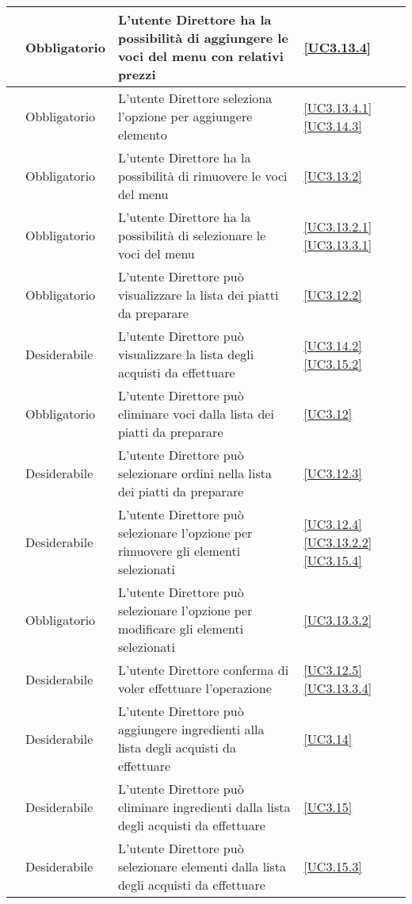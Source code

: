 \begin{longtable}{|P{1.5cm}|P{2.5cm}|P{6.5cm}|P{2.5cm}|}
	\hline \RequisitoObF\label{L79} & Obbligatorio & L'utente Direttore ha la possibilità di aggiungere le voci del menu con relativi prezzi & \ref{UC3.13.4} \\
	\hline \RequisitoObF\label{L108} & Obbligatorio & L'utente Direttore seleziona l'opzione per aggiungere elemento & \ref{UC3.13.4.1} \ref{UC3.14.3}\\
	\hline \RequisitoObF\label{L80} & Obbligatorio & L'utente Direttore ha la possibilità di rimuovere le voci del menu & \ref{UC3.13.2} \\
	\hline \RequisitoObF\label{L106} & Obbligatorio & L'utente Direttore ha la possibilità di selezionare le voci del menu & \ref{UC3.13.2.1} \ref{UC3.13.3.1} \\
	\hline \RequisitoObF\label{L30} & Obbligatorio & L'utente Direttore può visualizzare la lista dei piatti da preparare & \ref{UC3.12.2} \\
	\hline \RequisitoDF\label{L31} & Desiderabile & L'utente Direttore può visualizzare la lista degli acquisti da effettuare & \ref{UC3.14.2} \ref{UC3.15.2} \\
	\hline \RequisitoObF\label{L32} & Obbligatorio & L'utente Direttore può eliminare voci dalla lista dei piatti da preparare & \ref{UC3.12} \\
	\hline \RequisitoDF\label{L101} & Desiderabile & L'utente Direttore può selezionare ordini nella lista dei piatti da preparare & \ref{UC3.12.3} \\
	\hline \RequisitoDF\label{L102} & Desiderabile & L'utente Direttore può selezionare l'opzione per rimuovere gli elementi selezionati & \ref{UC3.12.4} \ref{UC3.13.2.2} \ref{UC3.15.4}\\
	\hline \RequisitoObF\label{L107} & Obbligatorio & L'utente Direttore può selezionare l'opzione per modificare gli elementi selezionati & \ref{UC3.13.3.2} \\
	\hline \RequisitoDF\label{L103} & Desiderabile & L'utente Direttore conferma di voler effettuare l'operazione & \ref{UC3.12.5} \ref{UC3.13.3.4} \\
	\hline \RequisitoDF\label{L53} & Desiderabile & L'utente Direttore può aggiungere ingredienti alla lista degli acquisti da effettuare & \ref{UC3.14}\\
	 \hline \RequisitoDF\label{L65} & Desiderabile & L'utente Direttore può eliminare ingredienti dalla lista degli acquisti da effettuare & \ref{UC3.15} \\
	\hline \RequisitoDF\label{L109} & Desiderabile & L'utente Direttore può selezionare elementi dalla lista degli acquisti da effettuare & \ref{UC3.15.3} \\

\end{longtable}
